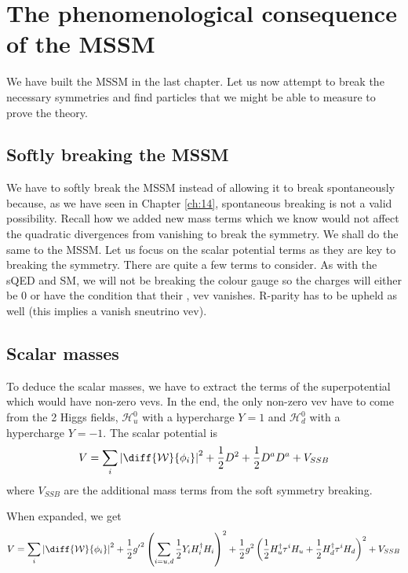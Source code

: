 \chapter{The phenomenological consequence of the MSSM}
\label{ch:16}

We have built the MSSM in the last chapter. Let us now attempt to break the necessary symmetries and find particles that we might be able to measure to prove the theory.

\section{Softly breaking the MSSM}
We have to softly break the MSSM instead of allowing it to break spontaneously because, as we have seen in Chapter \ref{ch:14}, spontaneous breaking is not a valid possibility. Recall how we added new mass terms which we know would not affect the quadratic divergences from vanishing to break the symmetry. We shall do the same to the MSSM. Let us focus on the scalar potential terms as they are key to breaking the symmetry. There are quite a few terms to consider. As with the sQED and SM, we will not be breaking the colour gauge so the charges will either be 0 or have the condition that their , vev vanishes. R-parity has to be upheld as well (this implies a vanish sneutrino vev).

\section{Scalar masses}
To deduce the scalar masses, we have to extract the terms of the superpotential which would have non-zero vevs. In the end, the only non-zero vev have to come from the 2 Higgs fields, $\mathcal{H}_u^0$ with a hypercharge $Y = 1$ and $\mathcal{H}_d^0$ with a hypercharge $Y = -1$. The scalar potential is
\begin{equation}
    V = \sum_i \left\vert \diff{\mathcal{W}}{\phi_i} \right\vert^2 + \frac{1}{2} D^2 + \frac{1}{2} D^a D^a + V_{SSB}
\end{equation}
where $V_{SSB}$ are the additional mass terms from the soft symmetry breaking.
 
When expanded, we get
\begin{equation}
    V = \sum_i \left\vert \diff{\mathcal{W}}{\phi_i} \right\rvert^2 + \frac{1}{2} {g^\prime}^2 \left(\sum_{i = u,d} \frac{1}{2} Y_i H_i^\dagger H_i \right)^2 + \frac{1}{2} g^2 \left(\frac{1}{2} H^\dagger_u \tau^i H_u + \frac{1}{2} H^\dagger_d \tau^i H_d \right)^2 + V_{SSB}
    \label{eqn:16:scalar potential}
\end{equation}

